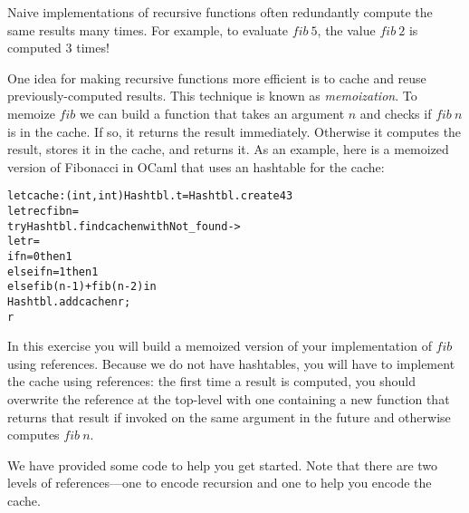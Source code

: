 \documentclass[10pt]{article}
\begin{document}
\begin{exercise}
Naive implementations of recursive functions often redundantly compute
the same results many times. For example, to evaluate
$\mathit{fib}~5$, the value $\mathit{fib}~2$ is computed $3$ times!

One idea for making recursive functions more efficient is to cache and
reuse previously-computed results. This technique is known as
\emph{memoization}. To memoize $\mathit{fib}$ we can build a function
that takes an argument $n$ and checks if $\mathit{fib}~n$ is in the
cache. If so, it returns the result immediately. Otherwise it computes
the result, stores it in the cache, and returns it. As an example,
here is a memoized version of Fibonacci in OCaml that uses an
hashtable for the cache:
%
\begin{alltt}
    let cache : (int,int) Hashtbl.t = Hashtbl.create 43
    let rec fib n =
      try Hashtbl.find cache n with Not_found -> 
        let r = 
          if n = 0 then 1
          else if n = 1 then 1 
          else fib (n-1) + fib (n-2) in
        Hashtbl.add cache n r; 
        r  
\end{alltt}

\noindent In this exercise you will build a memoized version of your
implementation of $\mathit{fib}$ using references. Because we do not
have hashtables, you will have to implement the cache using
references: the first time a result is computed, you should overwrite
the reference at the top-level with one containing a new function that
returns that result if invoked on the same argument in the future and
otherwise computes $\mathit{fib}~n$.
 
We have provided some code to help you get started. Note that there
are two levels of references---one to encode recursion and one to help
you encode the cache.

\bigskip


\end{exercise}
\end{document}

